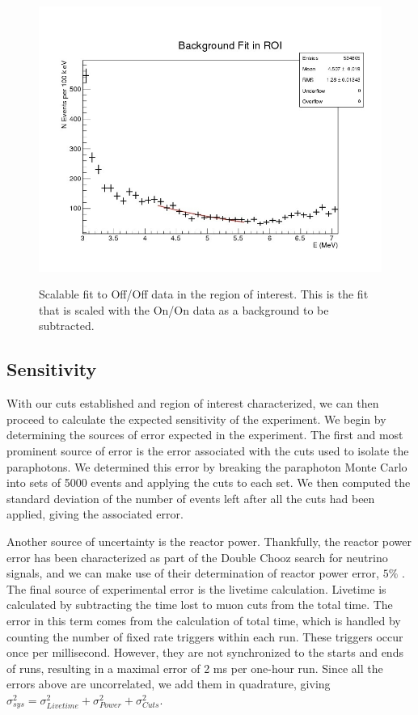 \begin{figure}
\caption{Scalable fit to Off/Off data in the region of interest. This is the fit that is scaled with the On/On data as a background to be subtracted.}
\includegraphics[width=\textwidth]{Paraphotons/Off_Off_Expo_edit.jpg}
\label{ROI Fit}
\end{figure}

\subsection{Sensitivity}
With our cuts established and region of interest characterized, we can then proceed to calculate the expected sensitivity of the experiment. We begin by determining the sources of error expected in the experiment. The first and most prominent source of error is the error associated with the cuts used to isolate the paraphotons. We determined this error by breaking the paraphoton Monte Carlo into sets of 5000 events and applying the cuts to each set. We then computed the standard deviation of the number of events left after all the cuts had been applied, giving the associated error. 

Another source of uncertainty is the reactor power. Thankfully, the reactor power error has been characterized as part of the Double Chooz search for neutrino signals, and we can make use of their determination of reactor power error, $5\%$ \cite{ReactorPaper}. The final source of experimental error is the livetime calculation. Livetime is calculated by subtracting the time lost to muon cuts from the total time. The error in this term comes from the calculation of total time, which is handled by counting the number of fixed rate triggers within each run. These triggers occur once per millisecond. However, they are not synchronized to the starts and ends of runs, resulting in a maximal error of 2 ms per one-hour run. Since all the errors above are uncorrelated, we add them in quadrature, giving $\sigma_{sys}^2 = \sigma_{Livetime}^2 + \sigma_{Power}^2 + \sigma_{Cuts}^2$.

